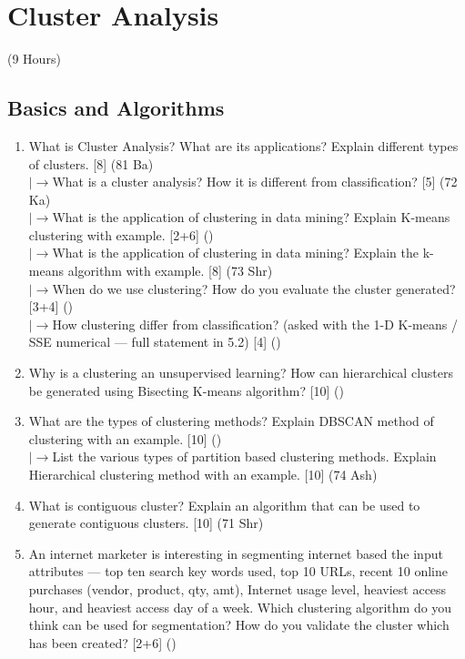 \documentclass[12pt]{article}
\newcommand{\lb}{\\$\left|\rightarrow\right.$}
\begin{document}
\pagebreak
\section{Cluster Analysis}
\begin{center}(9 Hours)\end{center}

  \subsection{Basics and Algorithms}
    \begin{enumerate}[topsep=0pt, noitemsep]
      \item What is Cluster Analysis? What are its applications? Explain different types of clusters. \hfill [8] (81 Ba)
        \lb What is a cluster analysis? How it is different from classification? \hfill [5] (72 Ka)
        \lb What is the application of clustering in data mining? Explain K-means clustering with example. \hfill [2+6] ()
        \lb What is the application of clustering in data mining? Explain the k-means algorithm with example. \hfill [8] (73 Shr)
        \lb When do we use clustering? How do you evaluate the cluster generated? \hfill [3+4] ()
        \lb How clustering differ from classification? (asked with the 1-D K-means / SSE numerical --- full statement in 5.2) \hfill [4] ()

      \item Why is a clustering an unsupervised learning? How can hierarchical clusters be generated using Bisecting K-means algorithm? \hfill [10] ()

      \item What are the types of clustering methods? Explain DBSCAN method of clustering with an example. \hfill [10] ()
        \lb List the various types of partition based clustering methods. Explain Hierarchical clustering method with an example. \hfill [10] (74 Ash)

      \item What is contiguous cluster? Explain an algorithm that can be used to generate contiguous clusters. \hfill [10] (71 Shr)

      \item An internet marketer is interesting in segmenting internet based the input attributes --- top ten search key words used, top 10 URLs, recent 10 online purchases (vendor, product, qty, amt), Internet usage level, heaviest access hour, and heaviest access day of a week. Which clustering algorithm do you think can be used for segmentation? How do you validate the cluster which has been created? \hfill [2+6] ()
    \end{enumerate}
\end{document}

